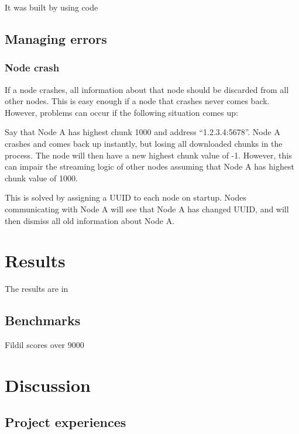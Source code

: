 \documentclass[10pt, a4paper]{article}
\begin{document}
It was built by using code

\subsection{Managing errors}

\subsubsection{Node crash}

If a node crashes, all information about that node should be discarded from all
other nodes. This is easy enough if a node that crashes never comes
back. However, problems can occur if the following situation comes up:

Say that Node A has highest chunk 1000 and address ``1.2.3.4:5678''. Node A
crashes and comes back up instantly, but losing all downloaded chunks in the
process. The node will then have a new highest chunk value of -1. However, this
can impair the streaming logic of other nodes assuming that Node A has highest
chunk value of 1000.

This is solved by assigning a UUID to each node on startup. Nodes communicating
with Node A will see that Node A has changed UUID, and will then dismiss all old
information about Node A.

\section{Results}
\label{sec:results}

The results are in

\subsection{Benchmarks}

Fildil scores over 9000

\section{Discussion}
\label{sec:discussion}

\subsection{Project experiences}

\end{document}
